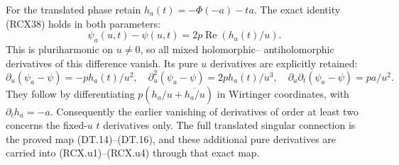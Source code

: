 For the translated phase retain $h_a(t)=-\Phi(-a)-ta$.
The exact identity (RCX38) holds in both parameters:
\[
 \psi_a(u,t)-\psi(u,t)=
             2p\operatorname{Re}(h_a(t)/u).          \tag{RCX.u5}
\]
This is pluriharmonic on $u\ne0$, so all mixed holomorphic--
antiholomorphic derivatives of this difference vanish.  Its
pure $u$ derivatives are explicitly retained:
\[
 \partial_u(\psi_a-\psi)=-p h_a(t)/u^2,\quad
 \partial_u^2(\psi_a-\psi)=2p h_a(t)/u^3,\quad
 \partial_u\partial_t(\psi_a-\psi)=p a/u^2.          \tag{RCX.u6}
\]
They follow by differentiating $p(h_a/u+\overline{h_a/u})$
in Wirtinger coordinates, with $\partial_t h_a=-a$.
Consequently the earlier vanishing of derivatives of order
at least two concerns the fixed-$u$ $t$ derivatives only.
The full translated singular connection is the proved map
(DT.14)--(DT.16), and these additional pure derivatives
are carried into (RCX.u1)--(RCX.u4) through that exact map.
